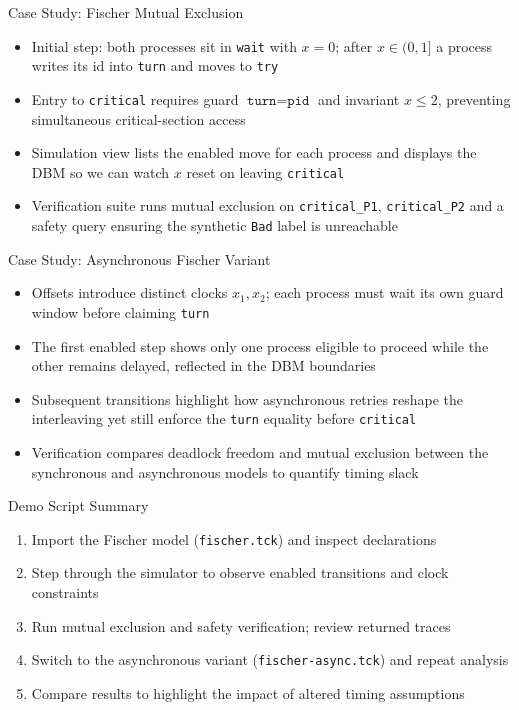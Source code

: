 \documentclass{beamer}
\begin{document}
\begin{frame}{Case Study: Fischer Mutual Exclusion}
  \begin{itemize}
    \item Initial step: both processes sit in \texttt{wait} with \(x=0\); after \(x \in (0,1]\) a process writes its id into \texttt{turn} and moves to \texttt{try}
    \item Entry to \texttt{critical} requires guard \(\texttt{turn} = \texttt{pid}\) and invariant \(x \le 2\), preventing simultaneous critical-section access
    \item Simulation view lists the enabled move for each process and displays the DBM so we can watch \(x\) reset on leaving \texttt{critical}
    \item Verification suite runs mutual exclusion on \texttt{critical\_P1}, \texttt{critical\_P2} and a safety query ensuring the synthetic \texttt{Bad} label is unreachable
  \end{itemize}
\end{frame}

\begin{frame}{Case Study: Asynchronous Fischer Variant}
  \begin{itemize}
    \item Offsets introduce distinct clocks \(x_1, x_2\); each process must wait its own guard window before claiming \texttt{turn}
    \item The first enabled step shows only one process eligible to proceed while the other remains delayed, reflected in the DBM boundaries
    \item Subsequent transitions highlight how asynchronous retries reshape the interleaving yet still enforce the \texttt{turn} equality before \texttt{critical}
    \item Verification compares deadlock freedom and mutual exclusion between the synchronous and asynchronous models to quantify timing slack
  \end{itemize}
\end{frame}

\begin{frame}{Demo Script Summary}
  \begin{enumerate}
    \item Import the Fischer model (\texttt{fischer.tck}) and inspect declarations
    \item Step through the simulator to observe enabled transitions and clock constraints
    \item Run mutual exclusion and safety verification; review returned traces
    \item Switch to the asynchronous variant (\texttt{fischer-async.tck}) and repeat analysis
    \item Compare results to highlight the impact of altered timing assumptions
  \end{enumerate}
\end{frame}
\end{document}
